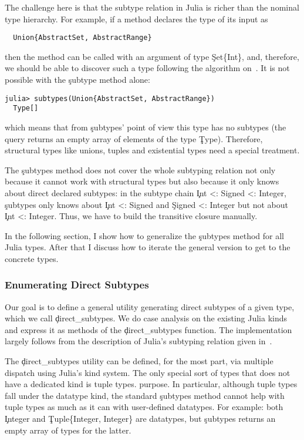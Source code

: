 The challenge here is that the subtype relation in Julia is richer than the
nominal type hierarchy. For example, if a method declares the type of its input
as
\begin{lstlisting}
  Union{AbstractSet, AbstractRange}
\end{lstlisting}
then the method can be called with an argument of type \c{Set\{Int\}}, and,
therefore, we should be able to discover such a type following the algorithm
on~. It is not possible with the \c{subtype} method alone:
\begin{lstlisting}[style=jterm]
  julia> subtypes(Union{AbstractSet, AbstractRange})
  Type[]
\end{lstlisting}
which means that from \c{subtypes}' point of view this type has no subtypes (the query
returns an empty array of elements of the type \c{Type}). Therefore, structural
types like unions, tuples and existential types need a special treatment.

The \c{subtypes} method does not cover the whole subtyping relation not only
because it cannot work with structural types but also because it only knows
about direct declared subtypes: in the subtype chain \c{Int <: Signed <:
Integer}, \c{subtypes} only knows about \c{Int <: Signed} and \c{Signed <:
Integer} but not about \c{Int <: Integer}. Thus, we have to build
the transitive closure manually.

In the following section, I show how to generalize the \c{subtypes} method
for all Julia types. After that I discuss how to iterate the general version to
get to the concrete types.

\subsubsection{Enumerating Direct Subtypes}

Our goal is to define a general utility generating direct subtypes of a given
type, which we call \c{direct_subtypes}.
We do case analysis on the existing Julia kinds and express it as methods
of the \c{direct_subtypes} function. The implementation largely follows from the
description of Julia's subtyping relation given in~\cite{oopsla18b}.

The \c{direct_subtypes} utility can be defined, for the most part, via multiple dispatch
using Julia's kind system.
The only special sort of types that does not have a dedicated kind is tuple types.
purpose. In particular, although tuple types fall under the datatype kind,
the standard \c{subtypes} method cannot help with tuple types as much as it can with user-defined datatypes.
For example:
both \c{Integer} and \c{Tuple\{Integer, Integer\}} are datatypes, but
\c{subtypes} returns an empty array of types for the latter.

